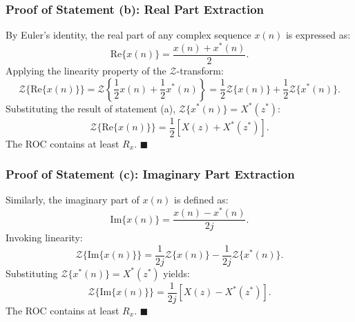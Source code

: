 \documentclass[12pt,a4paper]{article}
\begin{document}
\subsubsection{Proof of Statement (b): Real Part Extraction}
By Euler's identity, the real part of any complex sequence $x(n)$ is expressed as:
\begin{equation}
    \text{Re}\{x(n)\} = \frac{x(n) + x^*(n)}{2}.
\end{equation}
Applying the linearity property of the $\mathcal{Z}$-transform:
\begin{equation}
    \mathcal{Z}\{\text{Re}\{x(n)\}\} = \mathcal{Z}\left\{ \frac{1}{2} x(n) + \frac{1}{2} x^*(n) \right\} = \frac{1}{2} \mathcal{Z}\{x(n)\} + \frac{1}{2} \mathcal{Z}\{x^*(n)\}.
\end{equation}
Substituting the result of statement (a), $\mathcal{Z}\{x^*(n)\} = X^*(z^*)$:
\begin{equation}
    \mathcal{Z}\{\text{Re}\{x(n)\}\} = \frac{1}{2} \left[ X(z) + X^*(z^*) \right].
\end{equation}
The ROC contains at least $R_x$. \hfill $\blacksquare$

\subsubsection{Proof of Statement (c): Imaginary Part Extraction}
Similarly, the imaginary part of $x(n)$ is defined as:
\begin{equation}
    \text{Im}\{x(n)\} = \frac{x(n) - x^*(n)}{2j}.
\end{equation}
Invoking linearity:
\begin{equation}
    \mathcal{Z}\{\text{Im}\{x(n)\}\} = \frac{1}{2j} \mathcal{Z}\{x(n)\} - \frac{1}{2j} \mathcal{Z}\{x^*(n)\}.
\end{equation}
Substituting $\mathcal{Z}\{x^*(n)\} = X^*(z^*)$ yields:
\begin{equation}
    \mathcal{Z}\{\text{Im}\{x(n)\}\} = \frac{1}{2j} \left[ X(z) - X^*(z^*) \right].
\end{equation}
The ROC contains at least $R_x$. \hfill $\blacksquare$
\end{document}
